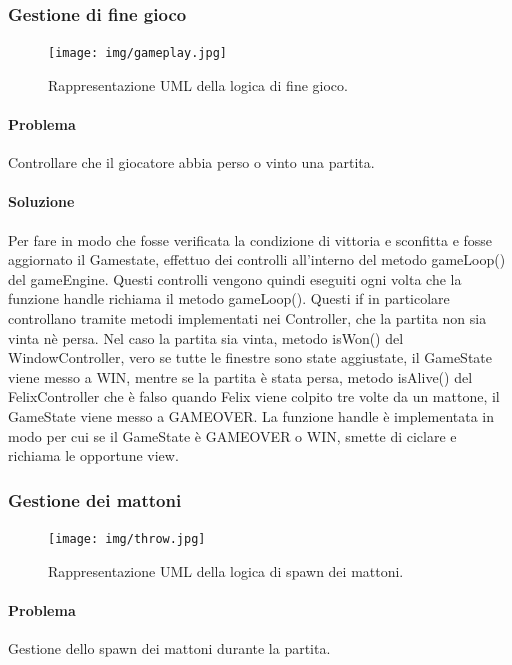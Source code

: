\documentclass[a4paper,12pt]{report}
\begin{document}
\subsubsection{Gestione di fine gioco}

\begin{figure}[H]
\centering{}
\texttt{[image: img/gameplay.jpg]}
\caption{Rappresentazione UML della logica di fine gioco.}
\end{figure}

\paragraph{Problema} Controllare che il giocatore abbia perso o vinto una partita.

\paragraph{Soluzione} Per fare in modo che fosse verificata la condizione di vittoria e sconfitta e fosse aggiornato il Gamestate, effettuo dei controlli all'interno del metodo gameLoop() del gameEngine. Questi controlli vengono quindi eseguiti ogni volta che la funzione handle richiama il metodo gameLoop(). Questi if in particolare controllano tramite metodi implementati nei Controller, che la partita non sia vinta nè persa. Nel caso la partita sia vinta, metodo isWon() del WindowController, vero se tutte le finestre sono state aggiustate, il GameState viene messo a WIN, mentre se la partita è stata persa, metodo isAlive() del FelixController che è falso quando Felix viene colpito tre volte da un mattone, il GameState viene messo a GAMEOVER. La funzione handle è implementata in modo per cui se il GameState è GAMEOVER o WIN, smette di ciclare e richiama le opportune view. 

\subsubsection{Gestione dei mattoni}

\begin{figure}[H]
\centering{}
\texttt{[image: img/throw.jpg]}
\caption{Rappresentazione UML della logica di spawn dei mattoni.}
\end{figure}

\paragraph{Problema} Gestione dello spawn dei mattoni durante la partita.
\end{document}

